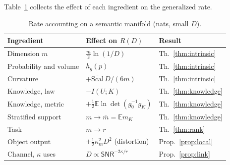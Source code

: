 \documentclass[10pt,journal]{IEEEtran}
\newcommand{\E}{\mathbb E}
\newcommand{\snr}{\mathsf{SNR}}
\begin{document}
Table~\ref{tab:account} collects the effect of each ingredient on the generalized rate.
\begin{table}[t]
\caption{Rate accounting on a semantic manifold (nats, small $D$).}\label{tab:account}\centering
\begin{tabular}{@{}lll@{}}\toprule
Ingredient & Effect on $R(D)$ & Result\\\midrule
Dimension $m$ & $\frac m2\ln(1/D)$ & Th.~\ref{thm:intrinsic}\\
Probability and volume & $h_g(p)$ & Th.~\ref{thm:intrinsic}\\
Curvature & $+\overline{\mathrm{Scal}}\,D/(6m)$ & Th.~\ref{thm:intrinsic}\\
Knowledge, law & $-I(U;K)$ & Th.~\ref{thm:knowledge}\\
Knowledge, metric & $+\frac12\E\ln\det(g_0^{-1}g_K)$ & Th.~\ref{thm:knowledge}\\
Stratified support & $m\to\bar m=\E m_K$ & Th.~\ref{thm:knowledge}\\
Task & $m\to r$ & Th.~\ref{thm:rank}\\
Object output & $+\frac12\kappa_m^2D^2$ (distortion) & Prop.~\ref{prop:local}\\
Channel, $\kappa$ uses & $D\propto\snr^{-2\kappa/r}$ & Prop.~\ref{prop:link}\\\bottomrule
\end{tabular}\end{table}
\end{document}
